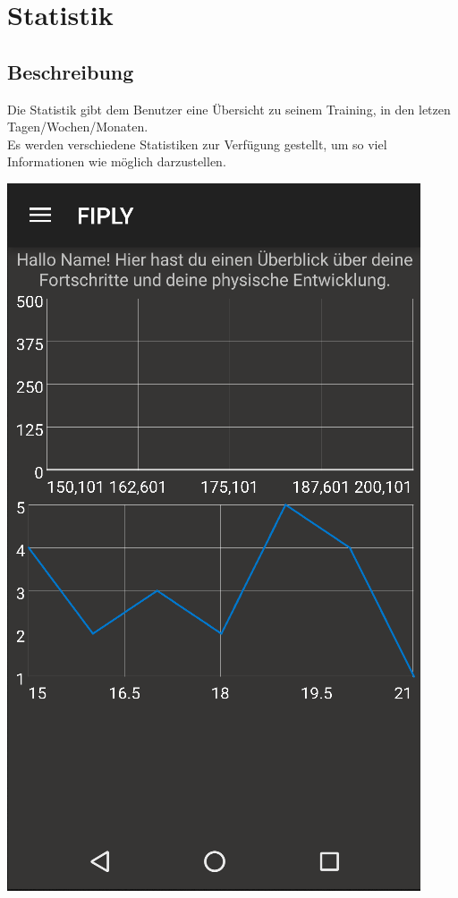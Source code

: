 \documentclass[FIPLY_base.tex]{subfiles}
\author{Gerald Irsiegler}
\date{26. Februar 2016}
\begin{document}
\section{Statistik}

\subsection{Beschreibung}
Die Statistik gibt dem Benutzer eine Übersicht zu seinem Training, in den letzen Tagen/Wochen/Monaten. 
\ \\
Es werden verschiedene Statistiken zur Verfügung gestellt, um so viel Informationen wie möglich darzustellen.

\includegraphics[scale=0.5]{img/Statistik}
\end{document}
